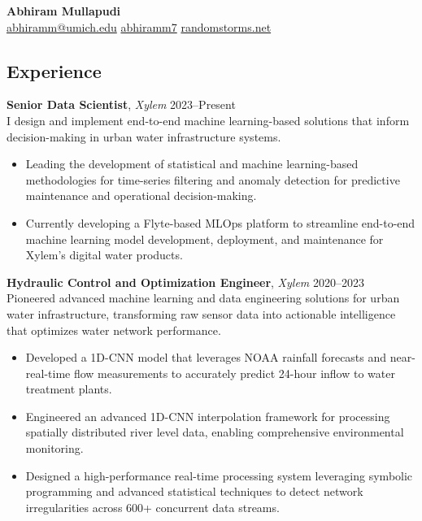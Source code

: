 \documentclass{article}
\newcommand{\experience}[4]{
  \textbf{#1}, \textit{#2} \hfill \textcolor{tuftegray}{#3}\\
  #4
}
\begin{document}
\setlength{\parindent}{0pt}

\LARGE\textbf{Abhiram Mullapudi}\\
\vspace{1em}
\footnotesize\faEnvelope\hspace{0.5em}\href{mailto:abhiramm@umich.edu}{\footnotesize abhiramm@umich.edu}\hspace{0.5em}
\footnotesize\faGithub\hspace{0.5em}\href{https://github.com/abhiramm7}{\footnotesize abhiramm7}\hspace{0.5em}
\footnotesize\faGlobe\hspace{0.5em}\href{https://randomstorms.net}{\footnotesize randomstorms.net}

\begin{paracol}{2}

\section{Experience}
\experience{Senior Data Scientist}{Xylem}{2023--Present}{
I design and implement end-to-end machine learning-based solutions that inform decision-making in urban water infrastructure systems.
\begin{itemize}[leftmargin=*,itemsep=1mm]
  \item Leading the development of statistical and machine learning-based methodologies for time-series filtering and anomaly detection for predictive maintenance and operational decision-making.
  \item Currently developing a Flyte-based MLOps platform to streamline end-to-end machine learning model development, deployment, and maintenance for Xylem's digital water products.
\end{itemize}
}
\vspace{0.5em}

\experience{Hydraulic Control and Optimization Engineer}{Xylem}{2020--2023}{
Pioneered advanced machine learning and data engineering solutions for urban water infrastructure, transforming raw sensor data into actionable intelligence that optimizes water network performance.
\begin{itemize}[leftmargin=*,itemsep=1mm]
  \item Developed a 1D-CNN model that leverages NOAA rainfall forecasts and near-real-time flow measurements to accurately predict 24-hour inflow to water treatment plants.
  \item Engineered an advanced 1D-CNN interpolation framework for processing spatially distributed river level data, enabling comprehensive environmental monitoring.
  \item Designed a high-performance real-time processing system leveraging symbolic programming and advanced statistical techniques to detect network irregularities across 600+ concurrent data streams.
\end{itemize}
}


\end{paracol}
\end{document}

